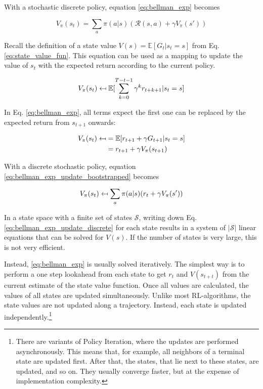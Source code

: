 With a stochastic discrete policy, equation \ref{eq:bellman_exp} becomes

\begin{equation}
V_\pi(s_t)=\sum_{a}\pi(a|s)(\mathcal{R}(s,a)+\gamma V_\pi(s'))
\label{eq:bellman_exp_discrete_policy}
\end{equation}

Recall the definition of a state value $V(s) = \mathbb{E}[G_t|s_t=s]$ from Eq. \ref{eq:state_value_fun}. This equation can be used as a mapping to update the value of $s_t$ with the expected return according to the current policy.

\begin{equation}
V_\pi(s_t) \mathrel{\reflectbox{\ensuremath{\mapsto}}} \mathbb{E}[ \sum_{k=0}^{T-t-1}\gamma^k r_{t+k+1}|s_t=s]
\label{eq:bellman_exp_update}
\end{equation}

In Eq. \ref{eq:bellman_exp}, all terms expect the first one can be replaced by the expected return from $s_{t+1}$ onwards:

\begin{align}
V_\pi(s_t) \mathrel{\reflectbox{\ensuremath{\mapsto}}} 
&=\mathbb{E}[r_{t+1}+\gamma G_{t+1}|s_t=s]\\
&=r_{t+1}+\gamma V_\pi(s_{t+1})
\label{eq:bellman_exp_update_bootstrapped}
\end{align}

With a discrete stochastic policy, equation \ref{eq:bellman_exp_update_bootstrapped} becomes


\begin{equation}
V_{\pi}(s_t) \mathrel{\reflectbox{\ensuremath{\mapsto}}} \sum_{a}\pi(a|s)(r_t+\gamma V_\pi(s'))
\label{eq:bellman_exp_update_discrete}
\end{equation}

In a state space with a finite set of states $\mathcal{S}$, writing down Eq. \ref{eq:bellman_exp_update_discrete} for each state results in a system of $|\mathcal{S}|$ linear equations that can be solved for $V(s)$. If the number of states is very large, this is not very efficient. 

Instead, \ref{eq:bellman_exp} is usually solved iteratively. The simplest way is to perform a one step lookahead from each state to get $r_t$ and $V(s_{t+t})$ from the current estimate of the state value function. Once all values are calculated, the values of all states are updated simultaneously. Unlike most RL-algorithms, the state values are not updated along a trajectory. Instead, each state is updated independently.\footnote{There are variants of Policy Iteration, where the updates are performed asynchronously. This means that, for example, all neighbors of a terminal state are updated first. After that, the states, that lie next to these states, are updated, and so on. They usually converge faster, but at the expense of implementation complexity.}

